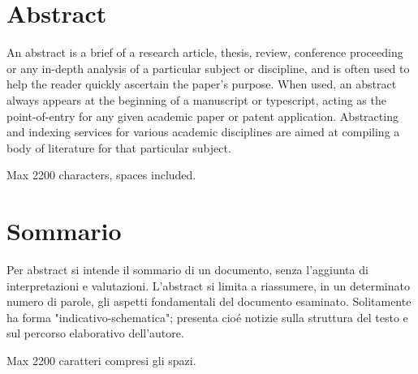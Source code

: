 
\begingroup
\let\clearpage\relax
\let\cleardoublepage\relax
\let\cleardoublepage\relax

\chapter*{Abstract}
An abstract is a brief of a research article, thesis, review,
conference proceeding or any in-depth analysis of a particular
subject or discipline, and is often used to help the reader
quickly ascertain the paper's purpose. When used, an abstract
always appears at the beginning of a manuscript or typescript,
acting as the point-of-entry for any given academic paper or
patent application. Abstracting and indexing services for various
academic disciplines are aimed at compiling a body of literature
for that particular subject.

Max 2200 characters, spaces included.

\vfill
\newpage
{}
\chapter*{Sommario}
Per abstract si intende il sommario di un documento, senza l'aggiunta di interpretazioni e valutazioni. L'abstract si limita a riassumere, in un determinato numero di parole, gli aspetti fondamentali del documento esaminato. Solitamente ha forma "indicativo-schematica"; presenta cioé notizie sulla struttura del testo e sul percorso elaborativo dell'autore.

Max 2200 caratteri compresi gli spazi.

\endgroup
